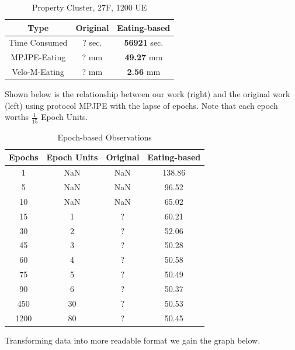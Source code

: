 \documentclass[10pt,twocolumn,letterpaper]{article}
\begin{document}
\begin{table}[H]
\caption{Property Cluster, 27F, 1200 UE}
\centering
\begin{tabular}{ccc}
\hline
Type & Original  & Eating-based\\
\hline

Time Consumed&  ? sec. & \textbf{56921} sec.\\
MPJPE-Eating&  ? mm & \textbf{49.27} mm\\
Velo-M-Eating&  ? mm & \textbf{2.56} mm  \\

\hline
\end{tabular}
\end{table}


Shown below is the relationship between our work (right) and the original work (left) using protocol MPJPE with the
lapse of epochs.
Note that each epoch worths $\frac{1}{15}$ Epoch Units.

\begin{table}[H]
\caption{Epoch-based Observations}
\centering
\begin{tabular}{cccc}
\hline
Epochs & Epoch Units & Original & Eating-based\\
\hline

1& NaN & NaN & 138.86 \\
5& NaN & NaN & 96.52  \\
10& NaN & NaN & 65.02  \\
15& 1 & ? & 60.21 \\
30& 2 & ? & 52.06 \\
45& 3 & ? & 50.28  \\
60& 4 & ? & 50.58  \\
75& 5 & ? & 50.49  \\
90& 6 & ? & 50.37 \\
450& 30 & ? & 50.53 \\
1200& 80 & ? & 50.45 \\


\hline
\end{tabular}
\end{table}

Transforming data into more readable format we gain the graph below.
\end{document}
